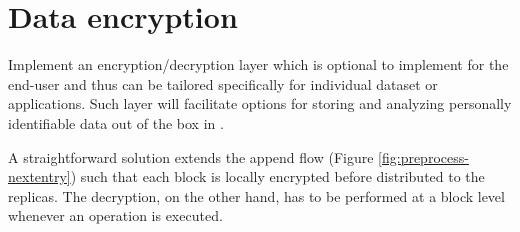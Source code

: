 \section{Data encryption}
Implement an encryption/decryption layer which is optional to implement for the end-user and thus can be tailored specifically for individual dataset or applications. Such layer will facilitate options for storing and analyzing personally identifiable data out of the box in \CodeName. 
\newline

A straightforward solution extends the append flow (Figure \ref{fig:preprocess-nextentry}) such that each block is locally encrypted before distributed to the replicas. The decryption, on the other hand, has to be performed at a block level whenever an operation is executed.
